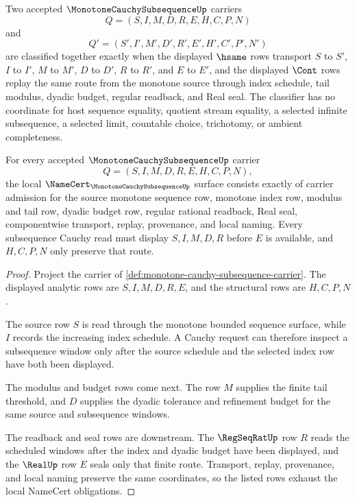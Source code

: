 \begin{definition}
\label{def:monotone-cauchy-subsequence-classifier}
Two accepted $\MonotoneCauchySubsequenceUp$ carriers
$$
Q=(S,I,M,D,R,E,H,C,P,N)
$$
and
$$
Q'=(S',I',M',D',R',E',H',C',P',N')
$$
are classified together exactly when the displayed $\hsame$ rows transport $S$ to $S'$, $I$ to $I'$, $M$ to $M'$, $D$ to $D'$, $R$ to $R'$, and $E$ to $E'$, and the displayed $\Cont$ rows replay the same route from the monotone source through index schedule, tail modulus, dyadic budget, regular readback, and Real seal. The classifier has no coordinate for host sequence equality, quotient stream equality, a selected infinite subsequence, a selected limit, countable choice, trichotomy, or ambient completeness.
\end{definition}

\begin{theorem}
\label{thm:monotone-cauchy-subsequence-namecert-obligations}
For every accepted $\MonotoneCauchySubsequenceUp$ carrier
$$
Q=(S,I,M,D,R,E,H,C,P,N),
$$
the local $\NameCert_{\MonotoneCauchySubsequenceUp}$ surface consists exactly of carrier admission for the source monotone sequence row, monotone index row, modulus and tail row, dyadic budget row, regular rational readback, Real seal, componentwise transport, replay, provenance, and local naming. Every subsequence Cauchy read must display $S,I,M,D,R$ before $E$ is available, and $H,C,P,N$ only preserve that route.
\end{theorem}
\begin{proof}
Project the carrier of \autoref{def:monotone-cauchy-subsequence-carrier}. The displayed analytic rows are $S,I,M,D,R,E$, and the structural rows are $H,C,P,N$.

The source row $S$ is read through the monotone bounded sequence surface, while $I$ records the increasing index schedule. A Cauchy request can therefore inspect a subsequence window only after the source schedule and the selected index row have both been displayed.

The modulus and budget rows come next. The row $M$ supplies the finite tail threshold, and $D$ supplies the dyadic tolerance and refinement budget for the same source and subsequence windows.

The readback and seal rows are downstream. The $\RegSeqRatUp$ row $R$ reads the scheduled windows after the index and dyadic budget have been displayed, and the $\RealUp$ row $E$ seals only that finite route. Transport, replay, provenance, and local naming preserve the same coordinates, so the listed rows exhaust the local NameCert obligations.
\end{proof}


